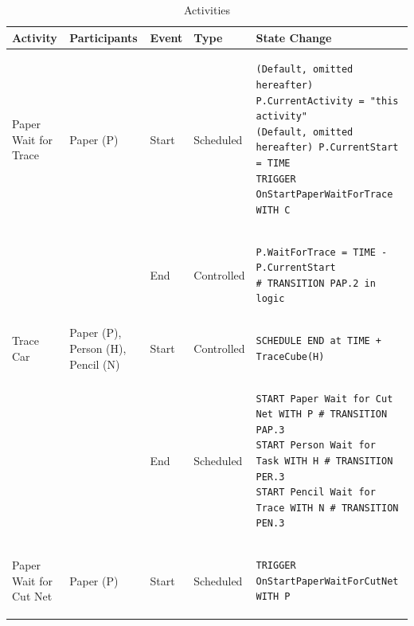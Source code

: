 \documentclass[
  10pt,
  a4paperpaper,
  DIV=11,
  numbers=noendperiod,
  oneside]{scrreprt}
\begin{document}
\begin{longtable}{@{}>{\raggedright\arraybackslash}p{1.8cm}>{\raggedright\arraybackslash}p{2.1cm}>{\raggedright\arraybackslash}p{0.9cm}>{\raggedright\arraybackslash}p{2.2cm}>{\raggedright\arraybackslash}p{8.75cm}@{}}

\caption{\label{tbl-activities_pc}Activities}

\tabularnewline

  \toprule
  Activity                                   & Participants                                             & Event & Type       & State Change \\ \midrule
  \endhead
  Paper Wait for Trace      & Paper (P)                            & Start & Scheduled  & 
\begin{lstlisting}[language=CMPseudo]
(Default, omitted hereafter) P.CurrentActivity = "this activity"
(Default, omitted hereafter) P.CurrentStart = TIME
TRIGGER OnStartPaperWaitForTrace WITH C
\end{lstlisting}             \\
                                             &                                                          & End   & Controlled &
  \begin{lstlisting}[language=CMPseudo]
P.WaitForTrace = TIME - P.CurrentStart
# TRANSITION PAP.2 in logic
  \end{lstlisting}              \\ \midrule
  Trace Car                 & Paper (P), Person (H), Pencil (N)       & Start & Controlled &  
\begin{lstlisting}[language=CMPseudo]
SCHEDULE END at TIME + TraceCube(H)
\end{lstlisting}              \\
                                             &                                                          & End   & Scheduled  & 
\begin{lstlisting}[language=CMPseudo]
START Paper Wait for Cut Net WITH P # TRANSITION PAP.3
START Person Wait for Task WITH H # TRANSITION PER.3
START Pencil Wait for Trace WITH N # TRANSITION PEN.3
\end{lstlisting}              \\ \midrule
  Paper Wait for Cut Net    & Paper (P)                               & Start & Scheduled  & 
\begin{lstlisting}[language=CMPseudo]
TRIGGER OnStartPaperWaitForCutNet WITH P
\end{lstlisting}              \\

\end{longtable}
\end{document}
